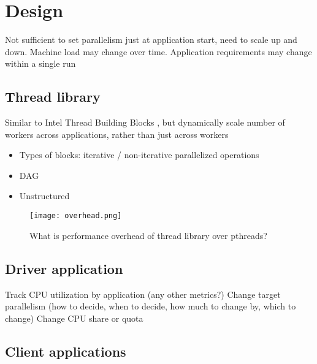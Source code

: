 \section{Design}
Not sufficient to set parallelism just at application start, need to scale up and down. Machine load may change over time. Application requirements may change within a single run

\subsection{Thread library}
Similar to Intel Thread Building Blocks \cite{reinders2007intel}, but dynamically scale number of workers across applications, rather than just across workers
\begin{itemize}
  \item Types of blocks: iterative / non-iterative parallelized operations
  \item DAG
  \item Unstructured
\end{itemize}

\begin{figure}
\centering
  \texttt{[image: overhead.png]}
  \caption{What is performance overhead of thread library over pthreads?}
\end{figure}
\subsection{Driver application}
Track CPU utilization by application (any other metrics?)
Change target parallelism (how to decide, when to decide, how much to change by, which to change)
Change CPU share or quota
\subsection{Client applications}

